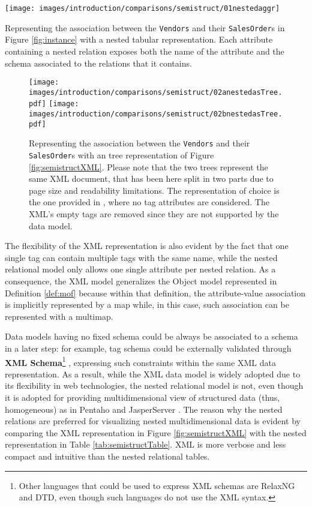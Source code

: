 \begin{table}[!t]
\centering
\texttt{[image: images/introduction/comparisons/semistruct/01nestedaggr]}
\caption{Representing the association between the \texttt{Vendors} and their \texttt{SalesOrder}s in Figure \ref{fig:instance} with a nested tabular representation. Each attribute containing a nested relation exposes both the name of the attribute and the schema associated to the relations that it contains. }
\label{tab:semistructTable}
\end{table}\begin{figure}[!t]
\texttt{[image: images/introduction/comparisons/semistruct/02anestedasTree.pdf]}
\texttt{[image: images/introduction/comparisons/semistruct/02bnestedasTree.pdf]}
\caption{Representing the association between the \texttt{Vendors} and their \texttt{SalesOrder}s with an tree representation of Figure \ref{fig:semistructXML}. Please note that the two trees represent the same XML document, that has been here split in two parts due to page size and readability limitations. The representation of choice is the one provided in \cite{Magnani06}, where no tag attributes are considered. The XML's empty tags are removed since they are not supported by the data model.}
\label{fig:semistructXMLTree}
\end{figure}

The flexibility of the XML representation is also evident by the fact that one single tag can contain multiple tags with the same name, while the nested relational model only allows one single attribute per nested relation. As a consequence, the XML model generalizes the Object model represented in Definition \vref{def:mof} because within that definition, the attribute-value association is implicitly represented by a map while, in this case, such association can be represented with a multimap.

Data models having no fixed schema could be always be associated to a schema in a later step: for example, tag schema could be externally validated through \textbf{XML Schema}\footnote{Other languages that could be used to express XML schemas are RelaxNG and DTD, even though such languages do not use the XML syntax.} \cite{VlistXS}, expressing such constraints within the same XML data representation. As a result, while the XML data model is widely adopted due to its flexibility in web technologies, the nested relational model is not, even though it is adopted for providing multidimensional view of structured data (thus, homogeneous) as in Pentaho \cite{Pentaho} and JasperServer \cite{Parra}. The reason why the nested relations are preferred for visualizing nested multidimensional data is evident by comparing the XML representation in Figure \ref{fig:semistructXML} with the nested representation in Table \ref{tab:semistructTable}. XML is more verbose and less compact and intuitive than  the nested relational tables.




